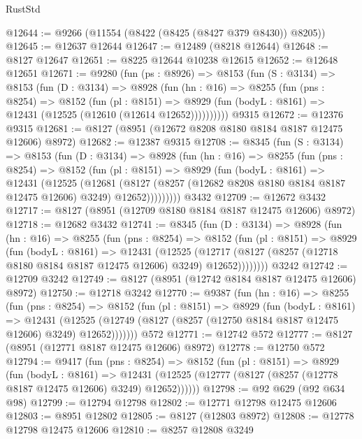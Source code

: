 \begin{lexlean}{RustStd}
\begin{coremodule}
@12644 := @9266 (@11554 (@8422 (@8425 (@8427 @379 @8430)) @8205))
@12645 := @12637 @12644
@12647 := @12489 (@8218 @12644)
@12648 := @8127 @12647
@12651 := @8225 @12644 @10238 @12615
@12652 := @12648 @12651
@12671 := @9280
    (fun (ps : @8926) =>
    @8153
      (fun (S : @3134) =>
      @8153
        (fun (D : @3134) =>
        @8928
          (fun (hn : @16) =>
          @8255
            (fun (pns : @8254) =>
            @8152
              (fun (pl : @8151) =>
              @8929 (fun (bodyL : @8161) => @12431 (@12525 (@12610 (@12614 @12652))))))))))
    @9315
@12672 := @12376 @9315
@12681 := @8127 (@8951 (@12672 @8208 @8180 @8184 @8187 @12475 @12606) @8972)
@12682 := @12387 @9315
@12708 := @8345
    (fun (S : @3134) =>
    @8153
      (fun (D : @3134) =>
      @8928
        (fun (hn : @16) =>
        @8255
          (fun (pns : @8254) =>
          @8152
            (fun (pl : @8151) =>
            @8929
              (fun (bodyL : @8161) =>
              @12431
                (@12525
                  (@12681
                    (@8127
                      (@8257 (@12682 @8208 @8180 @8184 @8187 @12475 @12606) @3249)
                      @12652)))))))))
    @3432
@12709 := @12672 @3432
@12717 := @8127 (@8951 (@12709 @8180 @8184 @8187 @12475 @12606) @8972)
@12718 := @12682 @3432
@12741 := @8345
    (fun (D : @3134) =>
    @8928
      (fun (hn : @16) =>
      @8255
        (fun (pns : @8254) =>
        @8152
          (fun (pl : @8151) =>
          @8929
            (fun (bodyL : @8161) =>
            @12431
              (@12525
                (@12717 (@8127 (@8257 (@12718 @8180 @8184 @8187 @12475 @12606) @3249) @12652))))))))
    @3242
@12742 := @12709 @3242
@12749 := @8127 (@8951 (@12742 @8184 @8187 @12475 @12606) @8972)
@12750 := @12718 @3242
@12770 := @9387
    (fun (hn : @16) =>
    @8255
      (fun (pns : @8254) =>
      @8152
        (fun (pl : @8151) =>
        @8929
          (fun (bodyL : @8161) =>
          @12431
            (@12525 (@12749 (@8127 (@8257 (@12750 @8184 @8187 @12475 @12606) @3249) @12652)))))))
    @572
@12771 := @12742 @572
@12777 := @8127 (@8951 (@12771 @8187 @12475 @12606) @8972)
@12778 := @12750 @572
@12794 := @9417
    (fun (pns : @8254) =>
    @8152
      (fun (pl : @8151) =>
      @8929
        (fun (bodyL : @8161) =>
        @12431 (@12525 (@12777 (@8127 (@8257 (@12778 @8187 @12475 @12606) @3249) @12652))))))
@12798 := @92 @629 (@92 @634 @98)
@12799 := @12794 @12798
@12802 := @12771 @12798 @12475 @12606
@12803 := @8951 @12802
@12805 := @8127 (@12803 @8972)
@12808 := @12778 @12798 @12475 @12606
@12810 := @8257 @12808 @3249

\end{coremodule}
\end{lexlean}

